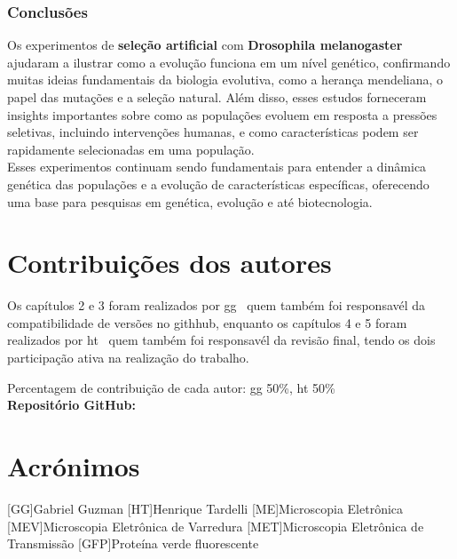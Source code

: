 \documentclass{report}
\begin{document}
\subsection{Conclusões}\label{subsec.cont1.3}

Os experimentos de \textbf{seleção artificial} com \textbf{Drosophila melanogaster} ajudaram a ilustrar como a evolução funciona em um nível genético, confirmando muitas ideias fundamentais da biologia evolutiva, como a herança mendeliana, o papel das mutações e a seleção natural. Além disso, esses estudos forneceram insights importantes sobre como as populações evoluem em resposta a pressões seletivas, incluindo intervenções humanas, e como características podem ser rapidamente selecionadas em uma população.\\
Esses experimentos continuam sendo fundamentais para entender a dinâmica genética das populações e a evolução de características específicas, oferecendo uma base para pesquisas em genética, evolução e até biotecnologia.


\chapter*{Contribuições dos autores}
Os capítulos 2 e 3 foram realizados por \ac{gg} \ quem também foi responsavél da compatibilidade de versões no githhub, enquanto os capítulos 4 e 5 foram realizados por \ac{ht} \ quem também foi responsavél da revisão final, tendo os dois participação ativa na realização do trabalho.

\vspace{10pt}
Percentagem de contribuição de cada autor: \ac{gg} 50\%, \ac{ht} 50\%\\

\vspace{10pt}
\textbf{Repositório GitHub:} \repo


\chapter*{Acrónimos}

\begin{acronym}

[GG]{Gabriel Guzman}
[HT]{Henrique Tardelli}
[ME]{Microscopia Eletrônica}
[MEV]{Microscopia Eletrônica de Varredura}
[MET]{Microscopia Eletrônica de Transmissão}
[GFP]{Proteína verde fluorescente}

\end{acronym}



\printbibliography
\end{document}
